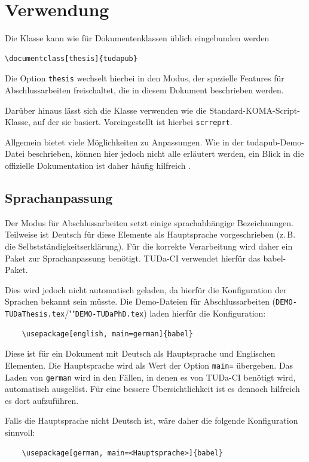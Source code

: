 \documentclass[
	german,%
	accentcolor=9c,%
	ruledheaders=section,%
	class=report,%
	thesis={type=bachelor},%
	fontsize=11pt,%
	parskip=half-,%
	custommargins=true,%
	marginpar=false,%
]{tudapub}
\newcommand*{\file}[1]{\texttt{#1}}
\newcommand*{\code}[1]{\texttt{#1}}
\begin{document}
\chapter{Verwendung}
Die Klasse kann wie für Dokumentenklassen üblich eingebunden werden
\begin{verbatim}
\documentclass[thesis]{tudapub}
\end{verbatim}
Die Option \code{thesis} wechselt hierbei in den Modus, der spezielle Features für Abschlussarbeiten freischaltet, die in diesem Dokument beschrieben werden.

Darüber hinaus lässt sich die Klasse verwenden wie die Standard-KOMA-Script-Klasse, auf der sie basiert.
Voreingestellt ist hierbei \code{scrreprt}.

Allgemein bietet \KOMAScript{} viele Möglichkeiten zu Anpassungen. Wie in der tudapub-Demo-Datei beschrieben, können hier jedoch nicht alle erläutert werden, ein Blick in die offizielle Dokumentation ist daher häufig hilfreich \cite{scrguide}.

\section{Sprachanpassung}
Der Modus für Abschlussarbeiten setzt einige sprachabhängige Bezeichnungen.
Teilweise ist Deutsch für diese Elemente als Hauptsprache vorgeschrieben (z.\,B. die Selbstständigkeitserklärung). Für die korrekte Verarbeitung wird daher ein Paket zur Sprachanpassung benötigt.
TUDa-CI verwendet hierfür das babel-Paket.

Dies wird jedoch nicht automatisch geladen, da hierfür die Konfiguration der Sprachen bekannt sein müsste. Die Demo-Dateien für Abschlussarbeiten (\file{DEMO-TUDaThesis.tex}/""\file{DEMO-TUDaPhD.tex}) laden hierfür die Konfiguration:
\begin{verbatim}
    \usepackage[english, main=german]{babel}
\end{verbatim}
Diese ist für ein Dokument mit Deutsch als Hauptsprache und Englischen Elementen.
Die Hauptsprache wird als Wert der Option \verb+main=+ übergeben.
Das Laden von \verb+german+ wird in den Fällen, in denen es von TUDa-CI benötigt wird, automatisch ausgelöst.
Für eine bessere Übersichtlichkeit ist es dennoch hilfreich es dort aufzuführen.

Falls die Hauptsprache nicht Deutsch ist, wäre daher die folgende Konfiguration sinnvoll:
\begin{verbatim}
    \usepackage[german, main=<Hauptsprache>]{babel}
\end{verbatim}
\end{document}
